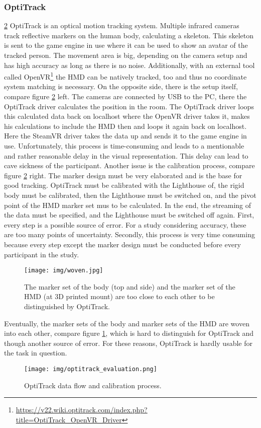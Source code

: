 \subsubsection{OptiTrack}
\ref{fig:optitrack} OptiTrack is an optical motion tracking system. Multiple infrared cameras track reflective markers on the human body, calculating a skeleton. This skeleton is sent to the game engine in use where it can be used to show an avatar of the tracked person. The movement area is big, depending on the camera setup and has high accuracy as long as there is no noise. Additionally, with an external tool called OpenVR\footnote{\href{https://v22.wiki.optitrack.com/index.php?title=OptiTrack\_OpenVR\_Driver}{https://v22.wiki.optitrack.com/index.php?title=OptiTrack\_OpenVR\_Driver}} the HMD can be natively tracked, too and thus no coordinate system matching is necessary. On the opposite side, there is the setup itself, compare figure \ref{fig:optitrack} left. The cameras are connected by USB to the PC, there the OptiTrack driver calculates the position in the room. The OptiTrack driver loops this calculated data back on localhost where the OpenVR driver takes it, makes his calculations to include the HMD then and loops it again back on localhost. Here the SteamVR driver takes the data up and sends it to the game engine in use. Unfortunately, this process is time-consuming and leads to a mentionable and rather reasonable delay in the visual representation. This delay can lead to cave sickness of the participant. Another issue is the calibration process, compare figure \ref{fig:optitrack} right. The marker design must be very elaborated and is the base for good tracking. OptiTrack must be calibrated with the Lighthouse of, the rigid body must be calibrated, then the Lighthouse must be switched on, and the pivot point of the HMD marker set mus to be calculated. In the end, the streaming of the data must be specified, and the Lighthouse must be switched off again. First, every step is a possible source of error. For a study considering accuracy, these are too many points of uncertainty. Secondly, this process is very time consuming because every step except the marker design must be conducted before every participant in the study.
\begin{figure}
	\centering
	\texttt{[image: img/woven.jpg]}
	\caption{The marker set of the body (top and side) and the marker set of the HMD (at 3D printed mount) are too close to each other to be distinguished by OptiTrack.}
	\label{fig:woven}
\end{figure}
Eventually, the marker sets of the body and marker sets of the HMD are woven into each other, compare figure \ref{fig:woven}, which is hard to distinguish for OptiTrack and though another source of error. For these reasons, OptiTrack is hardly usable for the task in question.
\begin{figure}
	\centering
	\texttt{[image: img/optitrack\_evaluation.png]}
	\caption{OptiTrack data flow and calibration process.}
	\label{fig:optitrack}
\end{figure}

